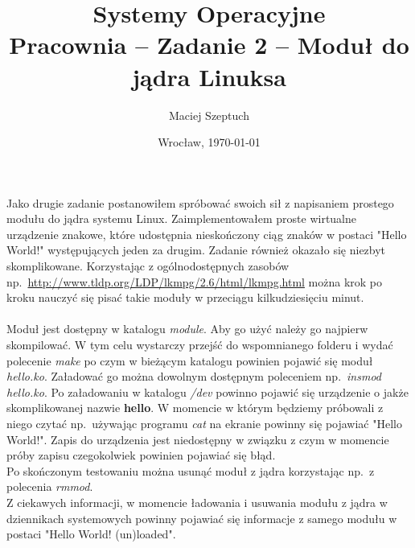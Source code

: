 \documentclass[12pt,leqno]{article}
\title{\LARGE \textbf{{Systemy Operacyjne}}\\
      {\Large Pracownia -- Zadanie 2 -- Moduł do jądra Linuksa}\\
}
\author{Maciej Szeptuch}
\date{Wrocław, \today}
\begin{document}
\thispagestyle{empty}
\maketitle

Jako drugie zadanie postanowiłem spróbować swoich sił z napisaniem prostego modułu
do jądra systemu Linux. Zaimplementowałem proste wirtualne urządzenie znakowe,
które udostępnia nieskończony ciąg znaków w postaci "Hello World!" występujących
jeden za drugim. Zadanie również okazało się niezbyt skomplikowane. Korzystając
z ogólnodostępnych zasobów np.\ \url{http://www.tldp.org/LDP/lkmpg/2.6/html/lkmpg.html}
można krok po kroku nauczyć się pisać takie moduły w przeciągu kilkudziesięciu minut. \\
\\
Moduł jest dostępny w katalogu \textit{module}. Aby go użyć należy go najpierw skompilować.
W tym celu wystarczy przejść do wspomnianego folderu i wydać polecenie \textit{make} po
czym w bieżącym katalogu powinien pojawić się moduł \textit{hello.ko}. Załadować go można
dowolnym dostępnym poleceniem np.\ \textit{insmod hello.ko}. Po załadowaniu w katalogu
\textit{/dev} powinno pojawić się urządzenie o jakże skomplikowanej nazwie \textbf{hello}.
W momencie w którym będziemy próbowali z niego czytać np.\ używając programu \textit{cat}
na ekranie powinny się pojawiać "Hello World!". Zapis do urządzenia jest niedostępny
w związku z czym w momencie próby zapisu czegokolwiek powinien pojawiać się błąd. \\
Po skończonym testowaniu można usunąć moduł z jądra korzystając np.\ z polecenia
\textit{rmmod}. \\
Z ciekawych informacji, w momencie ładowania i usuwania modułu z jądra w dziennikach
systemowych powinny pojawiać się informacje z samego modułu w postaci "Hello World! (un)loaded".
\end{document}
